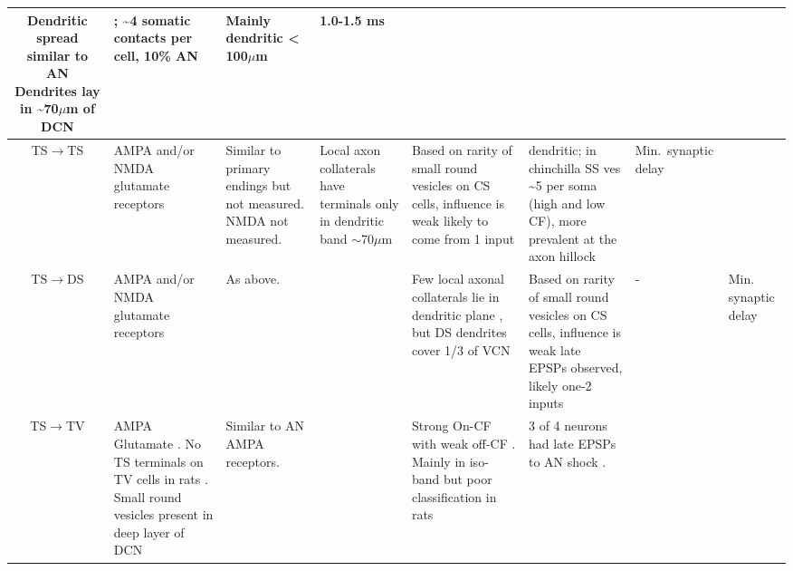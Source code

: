 \begin{longtable}{cXXXXXXX}
Dendritic spread similar to AN  \citep{SpirouDavisEtAl:1999} 
Dendrites lay in \~{}70$\mu$m of DCN \citep[mouse][]{ZhangOertel:1993}                          
& %
 \citep{SpirouDavisEtAl:1999,ZhangOertel:1993} ;
     \~{}4 somatic contacts per cell, 10\% AN \citep{Alibardi:1999}       
& %
Mainly dendritic {\textless} 100$\mu$m \citep{Alibardi:1999,Liberman:1993,RubioJuiz:2004,SpirouDavisEtAl:1999}  
& %
1.0-1.5 ms \citep{ZhangOertel:1993}
\\ \midrule
TS\ensuremath{\rightarrow}TS                        
& %
AMPA and/or NMDA glutamate receptors \citep{FerragamoGoldingEtAl:1998a}        
& %
Similar to primary endings but not measured.  
NMDA not measured.           
& %
Local axon collaterals have terminals only in dendritic band $\sim$70$\mu$m \citep[cat][]{SmithRhode:1989} 
& %
Based on rarity of small round vesicles on CS cells, influence is weak \citep{SmithRhode:1989} 
likely to come from 1 input \citep{FerragamoGoldingEtAl:1998a}                     
& %
dendritic; \citep{JosephsonMorest:1998}
in chinchilla SS ves \~{}5 per soma (high and low CF), more prevalent at the
                              axon hillock                                
& %
Min.\ synaptic delay 
\\ \midrule
TS\ensuremath{\rightarrow}DS                        
& %
AMPA and/or NMDA glutamate receptors \citep{FerragamoGoldingEtAl:1998a}  
& As above.                                   
& %
& %
Few local axonal collaterals lie in dendritic plane \citep{SmithRhode:1989}, but DS dendrites cover 1/3 of VCN
& 
Based on rarity of small round vesicles on CS cells, influence is weak \citep{SmithRhode:1989} late EPSPs observed,
likely one-2 inputs \citep{FerragamoGoldingEtAl:1998a, OertelWuEtAl:1990} 
& -                                     
& Min. synaptic delay \\ \midrule
TS\ensuremath{\rightarrow}TV                        
& %
AMPA Glutamate \citep{DoucetRossEtAl:1999,FerragamoGoldingEtAl:1998a,ZhangOertel:1993}.
No TS terminals on TV cells in rats \citep[rat][]{RubioJuiz:2004}.
Small round vesicles present in deep layer of DCN \citep[guinea pig][]{Alibardi:1999}
& 
Similar to AN AMPA receptors.        
& %
& %

Strong On-CF with weak off-CF  \citep[See fig 13][]{OstapoffBensonEtAl:1999}. 
Mainly in iso-band but poor classification in rats \citep{DoucetRossEtAl:1999,FriedlandPongstapornEtAl:2003}         
& %
3 of 4 neurons had late EPSPs to AN shock \citep[very young mice][]{ZhangOertel:1993}.
\citep{OstapoffBensonEtAl:1999} 


\end{longtable}
